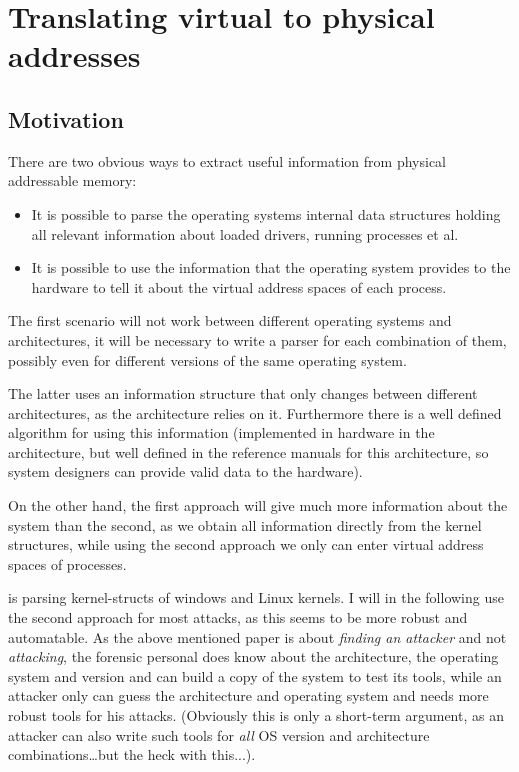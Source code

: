 %
%

\section{Translating virtual to physical addresses}

\subsection{Motivation}

There are two obvious ways to extract useful information from physical
addressable memory:

\begin{itemize}

	\item It is possible to parse the operating systems internal data
	structures holding all relevant information about loaded drivers,
	running processes et al.
	
	\item It is possible to use the information that the operating system
	provides to the hardware to tell it about the virtual address spaces of
	each process.
	
\end{itemize}

The first scenario will not work between different operating systems and
architectures, it will be necessary to write a parser for each combination of
them, possibly even for different versions of the same operating system.

The latter uses an information structure that only changes between different
architectures, as the architecture relies on it. Furthermore there is a well
defined algorithm for using this information (implemented in hardware in the
architecture, but well defined in the reference manuals for this architecture,
so system designers can provide valid data to the hardware).

On the other hand, the first approach will give much more information about the
system than the second, as we obtain all information directly from the kernel
structures, while using the second approach we only can enter virtual address
spaces of processes.

\cite{finding_digital_evidence_in_physical_memory:2006} is parsing
kernel-structs of windows and Linux kernels. I will in the following use the
second approach for most attacks, as this seems to be more robust and
automatable.  As the above mentioned paper is about \emph{finding an attacker}
and not \emph{attacking}, the forensic personal does know about the
architecture, the operating system and version and can build a copy of the
system to test its tools, while an attacker only can guess the architecture and
operating system and needs more robust tools for his attacks.  (Obviously this
is only a short-term argument, as an attacker can also write such tools for
\emph{all} OS version and architecture combinations\ldots but the heck with
this...).

